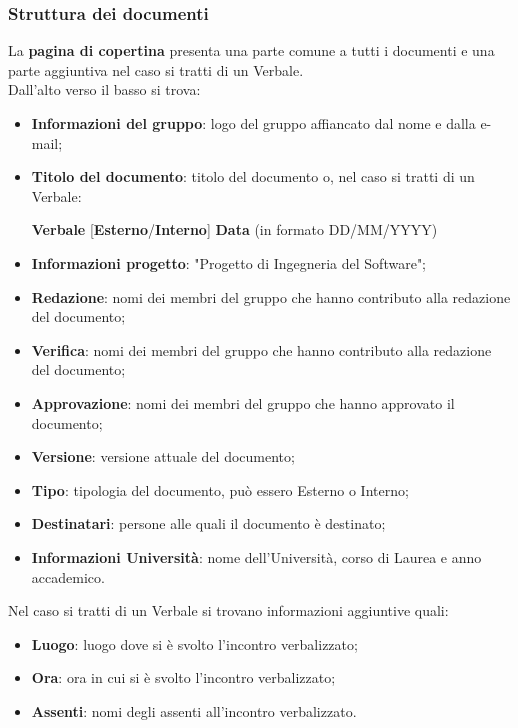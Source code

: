 \documentclass[a4paper,12pt]{article}
\begin{document}
        \subsubsection{Struttura dei documenti}
            La \textbf{pagina di copertina} presenta una parte comune a tutti i documenti e una parte aggiuntiva nel caso si tratti di un Verbale.\\
            Dall'alto verso il basso si trova:
            \begin{itemize}
                \item \textbf{Informazioni del gruppo}: logo del gruppo affiancato dal nome e dalla e-mail;
                \item \textbf{Titolo del documento}: titolo del documento o, nel caso si tratti di un Verbale:
                    \begin{center}
                        \textbf{Verbale} [\textbf{Esterno}/\textbf{Interno}] \textbf{Data} (in formato DD/MM/YYYY)
                    \end{center}
                \item \textbf{Informazioni progetto}: "Progetto di Ingegneria del Software";
                \item \textbf{Redazione}: nomi dei membri del gruppo che hanno contributo alla redazione del documento;
                \item \textbf{Verifica}: nomi dei membri del gruppo che hanno contributo alla redazione del documento;
                \item \textbf{Approvazione}: nomi dei membri del gruppo che hanno approvato il documento;
                \item \textbf{Versione}: versione attuale del documento;
                \item \textbf{Tipo}: tipologia del documento, può essero Esterno o Interno;
                \item \textbf{Destinatari}: persone alle quali il documento è destinato;
                \item \textbf{Informazioni Università}: nome dell'Università, corso di Laurea e anno accademico.
            \end{itemize}
            Nel caso si tratti di un Verbale si trovano informazioni aggiuntive quali:
            \begin{itemize}
                \item \textbf{Luogo}: luogo dove si è svolto l'incontro verbalizzato;
                \item \textbf{Ora}: ora in cui si è svolto l'incontro verbalizzato;
                \item \textbf{Assenti}: nomi degli assenti all'incontro verbalizzato.
            \end{itemize}
\end{document}
